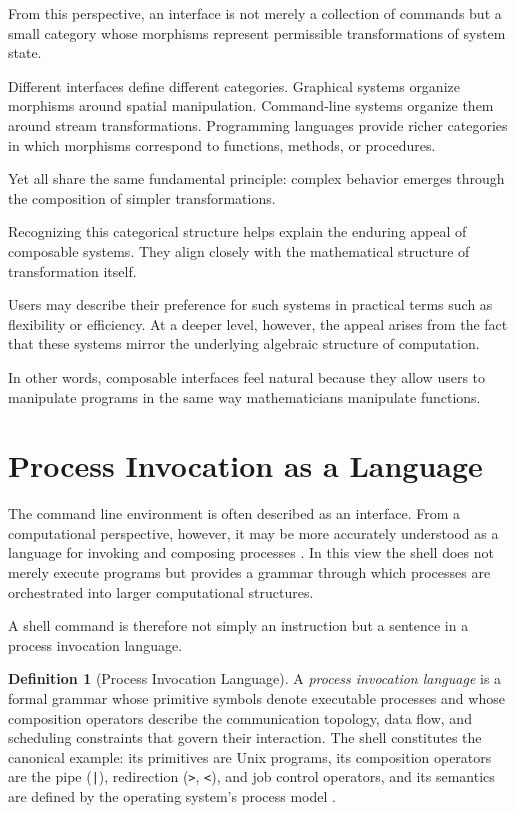 \documentclass[11pt]{article}
\theoremstyle{definition}
\newtheorem{definition}{Definition}[section]
\begin{document}
From this perspective, an interface is not merely a collection of
commands but a small category whose morphisms represent permissible
transformations of system state.

Different interfaces define different categories. Graphical systems
organize morphisms around spatial manipulation. Command-line systems
organize them around stream transformations. Programming languages
provide richer categories in which morphisms correspond to functions,
methods, or procedures.

Yet all share the same fundamental principle: complex behavior emerges
through the composition of simpler transformations.

Recognizing this categorical structure helps explain the enduring
appeal of composable systems. They align closely with the mathematical
structure of transformation itself.

Users may describe their preference for such systems in practical terms
such as flexibility or efficiency. At a deeper level, however, the
appeal arises from the fact that these systems mirror the underlying
algebraic structure of computation.

In other words, composable interfaces feel natural because they allow
users to manipulate programs in the same way mathematicians manipulate
functions.

\section{Process Invocation as a Language}

The command line environment is often described as an interface. From a
computational perspective, however, it may be more accurately understood
as a language for invoking and composing processes \cite{fant2006}. In
this view the shell does not merely execute programs but provides a
grammar through which processes are orchestrated into larger
computational structures.

A shell command is therefore not simply an instruction but a sentence in
a process invocation language.

\begin{definition}[Process Invocation Language]
A \emph{process invocation language} is a formal grammar whose primitive
symbols denote executable processes and whose composition operators
describe the communication topology, data flow, and scheduling
constraints that govern their interaction. The shell constitutes the
canonical example: its primitives are Unix programs, its composition
operators are the pipe (\texttt{|}), redirection (\texttt{>},
\texttt{<}), and job control operators, and its semantics are defined
by the operating system's process model \cite{ritchie1974}.
\end{definition}
\end{document}
